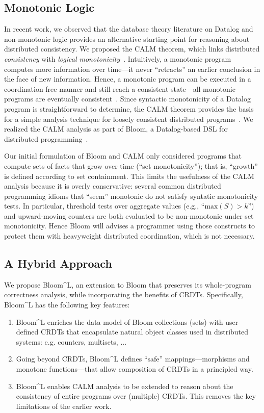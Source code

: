 \subsection{Monotonic Logic}
In recent work, we observed that the database theory literature on Datalog and  non-monotonic logic provides an alternative starting point for reasoning about distributed consistency.
We proposed the CALM theorem, which links distributed
\emph{consistency} with \emph{logical
  monotonicity}~\cite{Alvaro2011,Hellerstein2010}. Intuitively, a monotonic
program computes more information over time---it never ``retracts'' an earlier
conclusion in the face of new information. Hence, a monotonic program can be
executed in a coordination-free manner and still reach a consistent state---all
monotonic programs are eventually consistent~\cite{Ameloot2011}.  Since
syntactic monotonicity of a Datalog program is straightforward to determine, the
CALM theorem provides the basis for a simple analysis technique for loosely
consistent distributed programs~\cite{Alvaro2011}. We realized the CALM analysis
as part of Bloom, a Datalog-based DSL for distributed programming~\cite{bloom}.

Our initial formulation of Bloom and CALM only considered programs that compute
sets of facts that grow over time (``set monotonicity''); that is, ``growth'' is
defined according to set containment. This limits the usefulness of the CALM
analysis because it is overly conservative: several common distributed programming idioms that ``seem'' monotonic do not satisfy syntatic monotonicity tests. In particular, threshold tests over aggregate values (e.g.,
``$\textrm{max}(S) > k$'') and upward-moving counters are both evaluated to be non-monotonic
under set monotonicity.  Hence Bloom will advises a programmer using those constructs to protect them with heavyweight distributed coordination, which is not necessary.

\subsection{A Hybrid Approach}


We propose Bloom^L, an extension to Bloom that preserves its whole-program correctness analysis, while incorporating the benefits of CRDTs.  Specifically, Bloom^L has the following key features:

\begin{enumerate}
\item Bloom^L enriches the data model of Bloom collections (sets) with user-defined CRDTs that encapsulate natural object classes used in distributed systems: e.g. counters, multisets, ...

\item Going beyond CRDTs, Bloom^L defines ``safe'' mappings---morphisms and monotone functions---that allow composition of CRDTs in a principled way.

\item Bloom^L enables CALM analysis to be extended to reason about the consistency of entire programs over (multiple) CRDTs.  This removes the key limitations of the earlier work.
\end{enumerate}




  